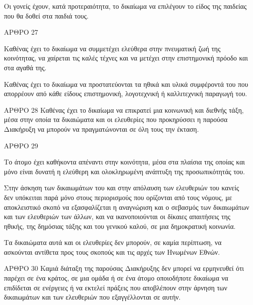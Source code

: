 \documentclass{report}
\begin{document}
            Οι γονείς έχουν, κατά προτεραιότητα, το δικαίωμα να επιλέγουν το είδος της παιδείας που θα δοθεί στα παιδιά τους.



      ΑΡΘΡΟ 27


            Καθένας έχει το δικαίωμα να συμμετέχει ελεύθερα στην πνευματική ζωή της κοινότητας, να χαίρεται τις καλές τέχνες και να μετέχει στην επιστημονική πρόοδο και στα αγαθά της.


            Καθένας έχει το δικαίωμα να προστατεύονται τα ηθικά και υλικά συμφέροντά του που απορρέουν από κάθε είδους επιστημονική, λογοτεχνική ή καλλιτεχνική παραγωγή του.



      ΑΡΘΡΟ 28
      Καθένας έχει το δικαίωμα να επικρατεί μια κοινωνική και διεθνής τάξη, μέσα στην οποία τα δικαιώματα και οι ελευθερίες που προκηρύσσει η παρούσα Διακήρυξη να μπορούν να πραγματώνονται σε όλη τους την έκταση.

      ΑΡΘΡΟ 29


            Το άτομο έχει καθήκοντα απέναντι στην κοινότητα, μέσα στα πλαίσια της οποίας και μόνο είναι δυνατή η ελεύθερη και ολοκληρωμένη ανάπτυξη της προσωπικότητάς του.


            Στην άσκηση των δικαιωμάτων του και στην απόλαυση των ελευθεριών του κανείς δεν υπόκειται παρά μόνο στους περιορισμούς που ορίζονται από τους νόμους, με αποκλειστικό σκοπό να εξασφαλίζεται η αναγνώριση και ο σεβασμός των δικαιωμάτων και των ελευθεριών των άλλων, και να ικανοποιούνται οι δίκαιες απαιτήσεις της ηθικής, της δημόσιας τάξης και του γενικού καλού, σε μια δημοκρατική κοινωνία.


            Τα δικαιώματα αυτά και οι ελευθερίες δεν μπορούν, σε καμία περίπτωση, να ασκούνται αντίθετα προς τους σκοπούς και τις αρχές των Ηνωμένων Εθνών.



      ΑΡΘΡΟ 30
      Καμιά διάταξη της παρούσας Διακήρυξης δεν μπορεί να ερμηνευθεί ότι παρέχει σε ένα κράτος, σε μια ομάδα ή σε ένα άτομο οποιοδήποτε δικαίωμα να επιδίδεται σε ενέργειες ή να εκτελεί πράξεις που αποβλέπουν στην άρνηση των δικαιωμάτων και των ελευθεριών που εξαγγέλλονται σε αυτήν.
\end{document}
